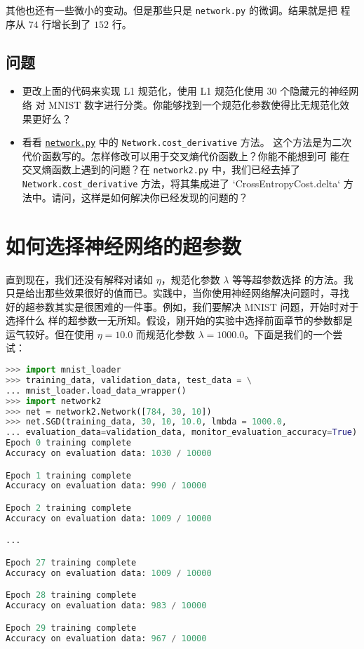 其他也还有一些微小的变动。但是那些只是 \lstinline!network.py! 的微调。结果就是把
程序从 $74$ 行增长到了 $152$ 行。

\subsection*{问题}

\begin{itemize}
\item 更改上面的代码来实现 L1 规范化，使用 L1 规范化使用 $30$ 个隐藏元的神经网络
  对 MNIST 数字进行分类。你能够找到一个规范化参数使得比无规范化效果更好么？
\item 看看 \href{https://github.com/mnielsen/neural-networks-and-deep-learning/blob/master/src/network.py}{\lstinline!network.py!} 中的 \lstinline!Network.cost_derivative! 方法。
  这个方法是为二次代价函数写的。怎样修改可以用于交叉熵代价函数上？你能不能想到可
  能在交叉熵函数上遇到的问题？在 \lstinline!network2.py! 中，我们已经去掉了
  \lstinline!Network.cost_derivative! 方法，将其集成进了
  `CrossEntropyCost.delta` 方法中。请问，这样是如何解决你已经发现的问题的？
\end{itemize}

\section{如何选择神经网络的超参数}
\label{sec:how_to_choose_a_neural_network's_hyper-parameters}

直到现在，我们还没有解释对诸如\learningrate{} $\eta$，规范化参数 $\lambda$ 等等超参数选择
的方法。我只是给出那些效果很好的值而已。实践中，当你使用神经网络解决问题时，寻找
好的超参数其实是很困难的一件事。例如，我们要解决 MNIST 问题，开始时对于选择什么
样的超参数一无所知。假设，刚开始的实验中选择前面章节的参数都是运气较好。但在使用
\learningrate{} $\eta=10.0$ 而规范化参数 $\lambda=1000.0$。下面是我们的一个尝试：

\begin{lstlisting}[language=Python]
>>> import mnist_loader
>>> training_data, validation_data, test_data = \
... mnist_loader.load_data_wrapper()
>>> import network2
>>> net = network2.Network([784, 30, 10])
>>> net.SGD(training_data, 30, 10, 10.0, lmbda = 1000.0,
... evaluation_data=validation_data, monitor_evaluation_accuracy=True)
Epoch 0 training complete
Accuracy on evaluation data: 1030 / 10000

Epoch 1 training complete
Accuracy on evaluation data: 990 / 10000

Epoch 2 training complete
Accuracy on evaluation data: 1009 / 10000

...

Epoch 27 training complete
Accuracy on evaluation data: 1009 / 10000

Epoch 28 training complete
Accuracy on evaluation data: 983 / 10000

Epoch 29 training complete
Accuracy on evaluation data: 967 / 10000
\end{lstlisting}


